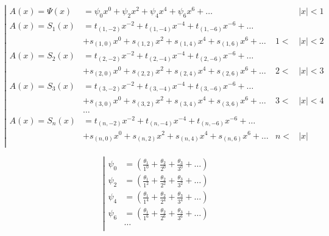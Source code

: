 \begin{equation*} \left| \begin{aligned}
A(x) = \Psi(x) &=
  \psi_0 x^0 
+ \psi_2 x^2
+ \psi_4 x^4 
+ \psi_6 x^6 
+ \ldots &
&|x| < 1 \\
%
A(x) = S_1(x) &= 
  t_{(1,-2)} x^{-2}
+ t_{(1,-4)} x^{-4}
+ t_{(1,-6)} x^{-6}
+ \ldots \\ &
+ s_{(1,0)} x^0
+ s_{(1,2)} x^2
+ s_{(1,4)} x^4
+ s_{(1,6)} x^6
+ \ldots &
1 < &|x| < 2 \\
%
A(x) = S_2(x) &= 
  t_{(2,-2)} x^{-2}
+ t_{(2,-4)} x^{-4}
+ t_{(2,-6)} x^{-6}
+ \ldots \\ &
+ s_{(2,0)} x^0
+ s_{(2,2)} x^2
+ s_{(2,4)} x^4
+ s_{(2,6)} x^6
+ \ldots &
2 < &|x| < 3 \\
%
A(x) = S_3(x) &= 
  t_{(3,-2)} x^{-2}
+ t_{(3,-4)} x^{-4}
+ t_{(3,-6)} x^{-6}
+ \ldots \\ &
+ s_{(3,0)} x^0
+ s_{(3,2)} x^2
+ s_{(3,4)} x^4
+ s_{(3,6)} x^6
+ \ldots &
3 < &|x| < 4 \\
%
&\ldots \\
%
A(x) = S_n(x) &= 
  t_{(n,-2)} x^{-2}
+ t_{(n,-4)} x^{-4}
+ t_{(n,-6)} x^{-6}
+ \ldots \\ &
+ s_{(n,0)} x^0
+ s_{(n,2)} x^2
+ s_{(n,4)} x^4
+ s_{(n,6)} x^6
+ \ldots &
n < &|x| \\
\end{aligned} \right. \end{equation*}

\begin{equation*} \left| \begin{aligned}
\psi_0 &= \left(
  \frac{\theta_1}{1^0}
+ \frac{\theta_2}{2^0}
+ \frac{\theta_3}{3^0}
+ \ldots
  \right) \\
%
\psi_2 &= \left(
  \frac{\theta_1}{1^2}
+ \frac{\theta_2}{2^2}
+ \frac{\theta_3}{3^2}
+ \ldots \right) \\
%
\psi_4 &= \left(
  \frac{\theta_1}{1^4}
+ \frac{\theta_2}{2^4}
+ \frac{\theta_3}{3^4}
+ \ldots \right) \\
%
\psi_6 &= \left(
  \frac{\theta_1}{1^6}
+ \frac{\theta_2}{2^6}
+ \frac{\theta_3}{3^6}
+ \ldots \right) \\
%
&\ldots \\
\end{aligned} \right. \end{equation*}

